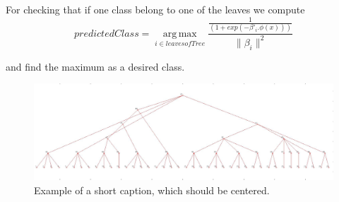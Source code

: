 \documentclass[10pt,twocolumn,letterpaper]{article}
\begin{document}
For checking that if one class belong to one of the leaves we compute 
\begin{displaymath}
predictedClass = \operatorname*{arg\,max}_{i \in leaves of Tree} 
\frac{\frac{1}{(1+exp(-\beta'_i.\phi(x)))}}{\|\beta_i\|^2}
\end{displaymath}  

and find the maximum as a desired class.

\begin{figure}
	\begin{center}
	    \includegraphics[width=1\linewidth]{carsDogs.png}
	\end{center}
	\caption{Example of a short caption, which should be centered.}
	\label{fig:short}
\end{figure}
{\small
  
  
}
\end{document}
